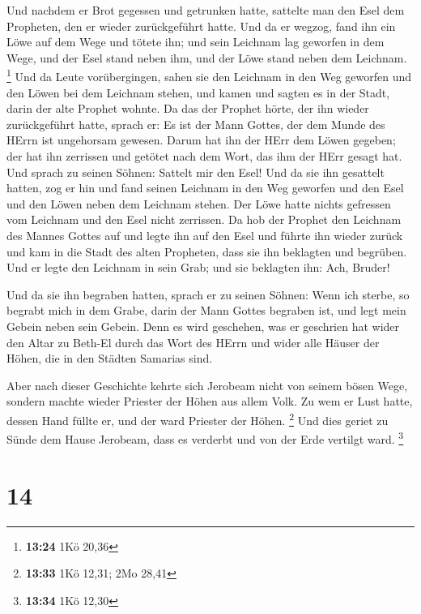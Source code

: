  Und nachdem er Brot gegessen und getrunken hatte, sattelte
man den Esel dem Propheten, den er wieder zurückgeführt hatte.
 Und da er wegzog, fand ihn ein Löwe auf dem Wege und
tötete ihn; und sein Leichnam lag geworfen in dem Wege, und der Esel
stand neben ihm, und der Löwe stand neben dem Leichnam. \footnote{\textbf{13:24}
  1Kö 20,36}  Und da Leute vorübergingen, sahen sie den
Leichnam in den Weg geworfen und den Löwen bei dem Leichnam stehen, und
kamen und sagten es in der Stadt, darin der alte Prophet wohnte.
 Da das der Prophet hörte, der ihn wieder zurückgeführt
hatte, sprach er: Es ist der Mann Gottes, der dem Munde des HErrn ist
ungehorsam gewesen. Darum hat ihn der HErr dem Löwen gegeben; der hat
ihn zerrissen und getötet nach dem Wort, das ihm der HErr gesagt hat.
 Und sprach zu seinen Söhnen: Sattelt mir den Esel! Und da
sie ihn gesattelt hatten,  zog er hin und fand seinen
Leichnam in den Weg geworfen und den Esel und den Löwen neben dem
Leichnam stehen. Der Löwe hatte nichts gefressen vom Leichnam und den
Esel nicht zerrissen.  Da hob der Prophet den Leichnam des
Mannes Gottes auf und legte ihn auf den Esel und führte ihn wieder
zurück und kam in die Stadt des alten Propheten, dass sie ihn beklagten
und begrüben.  Und er legte den Leichnam in sein Grab; und
sie beklagten ihn: Ach, Bruder!

 Und da sie ihn begraben hatten, sprach er zu seinen
Söhnen: Wenn ich sterbe, so begrabt mich in dem Grabe, darin der Mann
Gottes begraben ist, und legt mein Gebein neben sein Gebein.
 Denn es wird geschehen, was er geschrien hat wider den
Altar zu Beth-El durch das Wort des HErrn und wider alle Häuser der
Höhen, die in den Städten Samarias sind.

 Aber nach dieser Geschichte kehrte sich Jerobeam nicht von
seinem bösen Wege, sondern machte wieder Priester der Höhen aus allem
Volk. Zu wem er Lust hatte, dessen Hand füllte er, und der ward Priester
der Höhen. \footnote{\textbf{13:33} 1Kö 12,31; 2Mo 28,41} 
Und dies geriet zu Sünde dem Hause Jerobeam, dass es verderbt und von
der Erde vertilgt ward. \footnote{\textbf{13:34} 1Kö 12,30}

\hypertarget{section-3}{%
\section{14}\label{section-3}}

